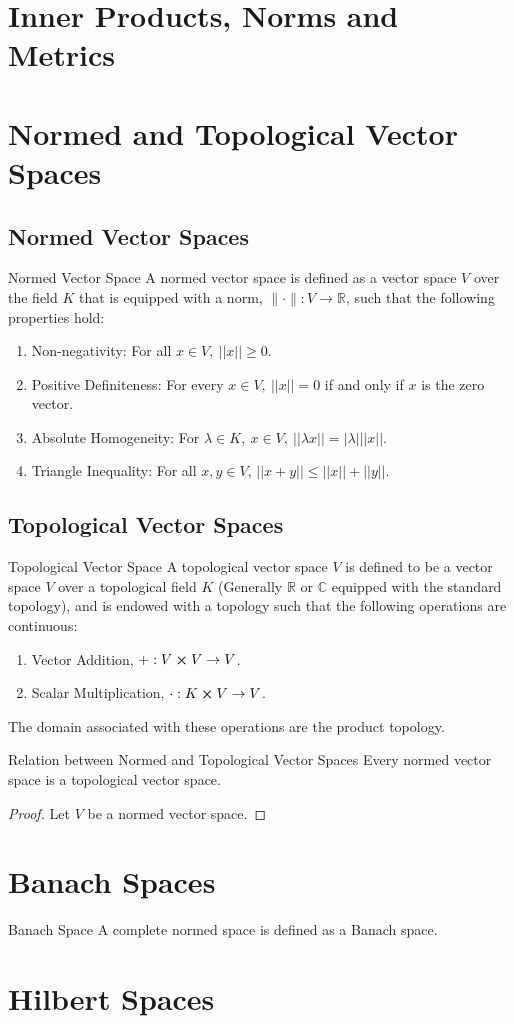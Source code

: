 \chapter{Inner Products, Norms and Metrics}
\chapter{Normed and Topological Vector Spaces}
\section{Normed Vector Spaces}
\begin{Definition}{Normed Vector Space}\label{normed_vector_space}
  A normed vector space is defined as a vector space $V$ over the field $K$ that is equipped with a norm, $\| \cdot \|:V\to\mathbb{R}$, such that the following properties hold:
  \begin{enumerate}
    \item Non-negativity: For all $x\in V,\ ||x||\geq 0$.
    \item Positive Definiteness: For every $x\in V,\ ||x||=0$ if and only if $x$ is the zero vector.
    \item Absolute Homogeneity: For $\lambda\in K,\ x\in V,\ ||\lambda x||=|\lambda| ||x||$.
    \item Triangle Inequality: For all $x,y\in V$, $||x+y||\leq||x||+||y||$.
  \end{enumerate}
\end{Definition}
\section{Topological Vector Spaces}
\begin{Definition}{Topological Vector Space}\label{topological_vector_space}
  A topological vector space $V$ is defined to be a vector space $V$ over a topological field $K$ (Generally $\mathbb{R}$ or $\mathbb{C}$ equipped with the standard topology), and is endowed with a topology such that the following operations are continuous:
  \begin{enumerate}
    \item Vector Addition, $+: V\cross V\to V$.
    \item Scalar Multiplication, $\cdot: K\cross V\to V$.
  \end{enumerate}
  The domain associated with these operations are the product topology.
\end{Definition}
\begin{Theorem}{Relation between Normed and Topological Vector Spaces}\label{relation_between_normed_and_topological_vector_spaces}
  Every normed vector space is a topological vector space.
\end{Theorem}
\begin{proof}
  Let $V$ be a normed vector space.
\end{proof}
\chapter{Banach Spaces}
\begin{Definition}{Banach Space}\label{banach_space}
  A complete normed space is defined as a Banach space.
\end{Definition}
\chapter{Hilbert Spaces}
